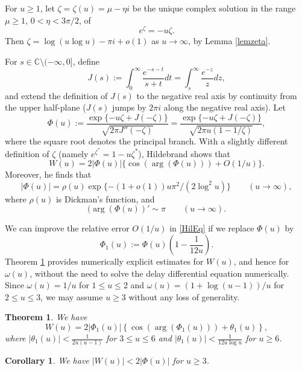 \documentclass[11pt]{amsart}
\newtheorem{theorem}{Theorem}
\newtheorem{corollary}{Corollary}
\begin{document}
For $u\ge 1$, let $\zeta=\zeta(u) = \mu-\eta i$ be the unique complex solution in the range $\mu\ge 1$, $0< \eta < 3\pi/2$, of 
$$e^\zeta=-u\zeta .$$ 
Then $\zeta=\log(u\log u)-\pi i +o(1)$ as $u\to \infty$, by Lemma \ref{lemzeta}.

For $s\in \mathbb{C}\setminus (-\infty,0]$, define
$$
J(s):=\int_0^\infty \frac{e^{-s-t}}{s+t} dt =  \int_s^\infty \frac{e^{-z}}{z}dz,
$$
and extend the definition of $J(s)$ to the negative real axis by continuity from the upper half-plane
($J(s)$ jumps by $2\pi i$ along the negative real axis).
Let
$$
\Phi(u):=\frac{\exp\{-u\zeta+J(-\zeta)\}}{\sqrt{2 \pi J''(-\zeta)}} = \frac{\exp\{-u\zeta+J(-\zeta)\}}{\sqrt{2 \pi u(1-1/\zeta)}},
$$
where the square root denotes the principal branch. 
With a slightly different definition of $\zeta$ (namely $e^{\zeta^*}=1-u \zeta^*$), 
Hildebrand \cite[(2.5)']{Hil} shows
that 
\begin{equation}\label{HilEq}
W(u)=2 |\Phi(u)|\{\cos(\arg(\Phi(u)))+O(1/u)\}.
\end{equation}
Moreover, he finds \cite[Cor.~2]{Hil} that 
$$|\Phi(u)| = \rho(u) \exp\{-(1+o(1)) u\pi^2/(2\log^2 u)\} \qquad (u\to \infty),$$ 
where $\rho(u)$ is Dickman's function, and 
$$(\arg(\Phi(u))'\sim \pi \qquad  (u \to \infty).$$

We can improve the relative error $O(1/u)$ in \eqref{HilEq} if we replace $\Phi(u)$ by
$$
\Phi_1(u):= \Phi(u)\left(1-\frac{1}{12u}\right).
$$
Theorem \ref{thm1} provides numerically explicit estimates for $W(u)$, and hence for $\omega(u)$,
without the need to solve the delay differential equation numerically.
Since $\omega(u)=1/u$ for $1\le u \le 2$ and $\omega(u)=(1+\log(u-1))/u$ for $2 \le u \le 3$, we 
may assume $u\ge 3$ without any loss of generality. 

\begin{theorem}\label{thm1}
We have 
$$
W(u)=2 |\Phi_1(u)|\left\{\cos(\arg(\Phi_1(u)))+\theta_1(u)\right\},
$$
where $|\theta_1(u)|< \frac{1}{2u(u-1)}$ for $3\le u\le 6$ and $|\theta_1(u)|< \frac{1}{12u\log u}$ for $u\ge 6$.
\end{theorem}

\begin{corollary}\label{cor1}
We have $|W(u)|<2|\Phi(u)|$ for $u\ge 3$. 
\end{corollary}
\end{document}

